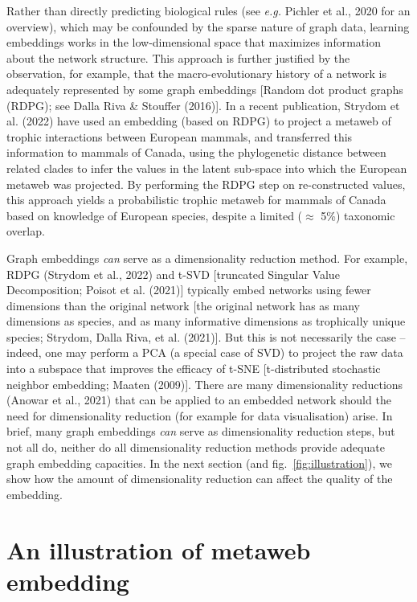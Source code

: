 \documentclass[10pt,oneside]{article}
\begin{document}
Rather than directly predicting biological rules (see \emph{e.g.}
Pichler et al., 2020 for an overview), which may be confounded by the
sparse nature of graph data, learning embeddings works in the
low-dimensional space that maximizes information about the network
structure. This approach is further justified by the observation, for
example, that the macro-evolutionary history of a network is adequately
represented by some graph embeddings {[}Random dot product graphs
(RDPG); see Dalla Riva \& Stouffer (2016){]}. In a recent publication,
Strydom et al. (2022) have used an embedding (based on RDPG) to project
a metaweb of trophic interactions between European mammals, and
transferred this information to mammals of Canada, using the
phylogenetic distance between related clades to infer the values in the
latent sub-space into which the European metaweb was projected. By
performing the RDPG step on re-constructed values, this approach yields
a probabilistic trophic metaweb for mammals of Canada based on knowledge
of European species, despite a limited (\(\approx\) 5\%) taxonomic
overlap.

Graph embeddings \emph{can} serve as a dimensionality reduction method.
For example, RDPG (Strydom et al., 2022) and t-SVD {[}truncated Singular
Value Decomposition; Poisot et al. (2021){]} typically embed networks
using fewer dimensions than the original network {[}the original network
has as many dimensions as species, and as many informative dimensions as
trophically unique species; Strydom, Dalla Riva, et al. (2021){]}. But
this is not necessarily the case -- indeed, one may perform a PCA (a
special case of SVD) to project the raw data into a subspace that
improves the efficacy of t-SNE {[}t-distributed stochastic neighbor
embedding; Maaten (2009){]}. There are many dimensionality reductions
(Anowar et al., 2021) that can be applied to an embedded network should
the need for dimensionality reduction (for example for data
visualisation) arise. In brief, many graph embeddings \emph{can} serve
as dimensionality reduction steps, but not all do, neither do all
dimensionality reduction methods provide adequate graph embedding
capacities. In the next section (and fig.~\ref{fig:illustration}), we
show how the amount of dimensionality reduction can affect the quality
of the embedding.

\hypertarget{an-illustration-of-metaweb-embedding}{%
\section{An illustration of metaweb
embedding}\label{an-illustration-of-metaweb-embedding}}
\end{document}
